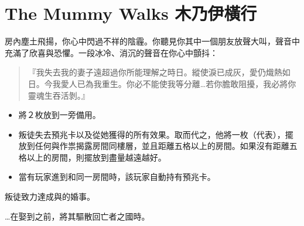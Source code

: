 
\chapter{The Mummy Walks 木乃伊橫行}

\begin{HauntStory}
  房內塵土飛揚，你心中閃過不祥的陰霾。你聽見你其中一個朋友放聲大叫，聲音中充滿了欣喜與恐懼。一段冰冷、消沉的聲音在你心中顫抖：
  \begin{quote}
    『我失去我的妻子遠超過你所能理解之時日。縱使淚已成灰，愛仍熾熱如日。今我愛人已為我重生。你必不能使我等分離…若你膽敢阻擾，我必將你靈魂生吞活剝。』
  \end{quote}
\end{HauntStory}

\vspace*{-1em}
\begin{itemize}
  \item 將２枚放到一旁備用。
  \item 叛徒失去預兆卡以及從她獲得的所有效果。取而代之，他將一枚（代表），擺放到任何與作祟揭露房間同樓層，並且距離五格以上的房間。如果沒有距離五格以上的房間，則擺放到盡量越遠越好。
  \item 當有玩家進到和同一房間時，該玩家自動持有預兆卡。
\end{itemize}


叛徒致力達成與的婚事。


…在娶到之前，將其驅散回亡者之國時。

\vfill\null\pagebreak

